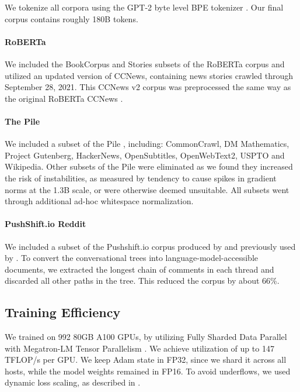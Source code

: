 We tokenize all corpora using the GPT-2 byte level BPE tokenizer \cite{sennrich2016bpe,radford2019language,brown2020gpt3}. Our final corpus contains roughly 180B tokens.

\paragraph{RoBERTa} We included the BookCorpus \cite{books2015} and Stories \cite{ccstories2018} subsets of the RoBERTa corpus and utilized an updated version of CCNews, containing news stories crawled through September 28, 2021. This CCNews v2 corpus was preprocessed the same way as the original RoBERTa CCNews \cite{liu2019roberta}.

\paragraph{The Pile} We included a subset of the Pile \cite{thepile}, including: CommonCrawl, DM Mathematics,  Project Gutenberg, HackerNews, OpenSubtitles, OpenWebText2, USPTO and Wikipedia. Other subsets of the Pile were eliminated as we found they increased the risk of instabilities, as measured by tendency to cause spikes in gradient norms at the 1.3B scale, or were otherwise deemed unsuitable.  All subsets went through additional ad-hoc whitespace normalization.

\paragraph{PushShift.io Reddit} We included a subset of the Pushshift.io corpus produced by \citet{reddit2020} and previously used by \citet{roller-etal-2021-recipes}. To convert the conversational trees into language-model-accessible documents, we extracted the longest chain of comments in each thread and discarded all other paths in the tree. This reduced the corpus by about 66\%.


\subsection{Training Efficiency}
\label{sec:training_efficiency}
We trained \OPT{} on 992 80GB A100 GPUs, by utilizing Fully Sharded Data Parallel \cite{1TMoE2021} with Megatron-LM Tensor Parallelism \cite{shoeybi2019megatron}. We achieve utilization of up to 147 TFLOP/s per GPU. We keep Adam state in FP32, since we shard it across all hosts, while the model weights remained in FP16. To avoid underflows, we used dynamic loss scaling, as described in \citet{micikevicius2017mixed}.


